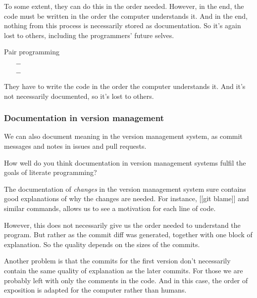 To some extent, they can do this in the order needed.
However, in the end, the code must be written in the order the computer 
understands it.
And in the end, nothing from this process is necessarily stored as 
documentation.
So it's again lost to others, including the programmers' future selves.

\begin{frame}
\begin{block}{Pair programming}
  \begin{itemize}
    \item[\(-\)] {\color{red}\LPexplain}
    \item[\(-\)] {\color{red}\LPorder}
  \end{itemize}
\end{block}

\begin{remark}
  They have to write the code in the order the computer understands it.
  And it's not necessarily documented, so it's lost to others.
\end{remark}
\end{frame}

\subsubsection{Documentation in version management}

We can also document meaning in the version management system, as commit 
messages and notes in issues and pull requests.

\begin{frame}
\begin{activity}
How well do you think documentation in version management systems fulfil the 
goals of literate programming?
\end{activity}
\end{frame}

The documentation of \emph{changes} in the version management system sure 
contains good explanations of why the changes are needed.
For instance, [[git blame]] and similar commands, allows us to see a motivation 
for each line of code.

However, this does not necessarily give us the order needed to understand the 
program.
But rather as the commit diff was generated, together with one block of 
explanation.
So the quality depends on the sizes of the commits.

Another problem is that the commits for the first version don't necessarily 
contain the same quality of explanation as the later commits.
For those we are probably left with only the comments in the code.
And in this case, the order of exposition is adapted for the computer rather 
than humans.

